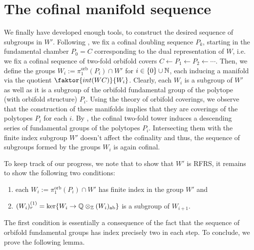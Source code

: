 \newpage
\section{The cofinal manifold sequence}

We finally have developed enough tools, to construct the desired sequence of subgroups in \(W'\).
Following , we fix a cofinal doubling sequence \(P_k\), starting in the fundamental chamber \(P_0 = C\) corresponding to the dual representation of \(W\), i.e. we fix a cofinal sequence of two-fold orbifold covers \(C \leftarrow P_1 \leftarrow P_2 \leftarrow \cdots\).
Then, we define the groups \(W_i := \pi_1^{\text{orb}}(P_i) \cap W'\) for \(i \in \{0\} \cup \mathbb{N}\), each inducing a manifold via the quotient \(\faktor{int(WC)}{W_i}\).
Clearly, each \(W_i\) is a subgroup of \(W'\) as well as it is a subgroup of the orbifold fundamental group of the polytope (with orbifold structure) \(P_i\).
Using the theory of orbifold coverings, we observe that the construction of these manifolds implies that they are coverings of the polytopes \(P_i\) for each \(i\).
By , the cofinal two-fold tower induces a descending series of fundamental groups of the polytopes \(P_i\).
Intersecting them with the finite index subgroup \(W'\) doesn't affect the cofinality and thus, the sequence of subgroups formed by the groups \(W_i\) is again cofinal. %

\noindent
To keep track of our progress, we note that to show that \(W'\) is RFRS, it remains to show the following two conditions:
\begin{enumerate}
    \item each \(W_i := \pi_1^{\text{orb}}(P_i) \cap W'\) has finite index in the group \(W'\) and
    \item \((W_i)_r^{(1)} = \ker\{W_i \to \mathbb{Q} \otimes_{\mathbb{Z}} (W_i)_{\text{ab}}\}\) is a subgroup of \(W_{i+1}\).
\end{enumerate}
The first condition is essentially a consequence of the fact that the sequence of orbifold fundamental groups has index precisely two in each step.
To conclude, we prove the following lemma.

